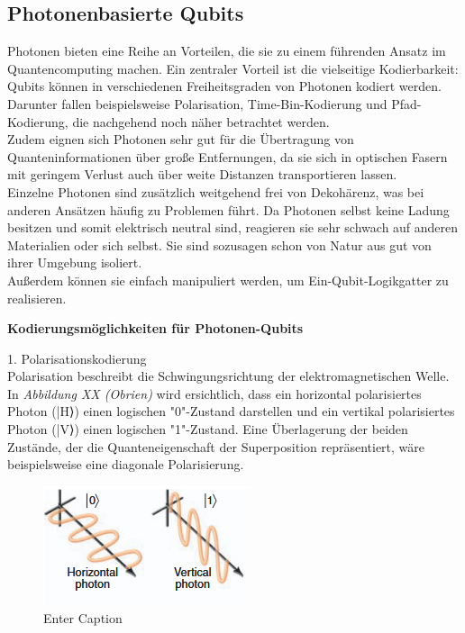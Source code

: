 \subsection{Photonenbasierte Qubits}
\label{subsec: Photonenbasierte Qubits}
Photonen bieten eine Reihe an Vorteilen, die sie zu einem führenden Ansatz im Quantencomputing machen. Ein zentraler Vorteil ist die vielseitige Kodierbarkeit: Qubits können in verschiedenen Freiheitsgraden von Photonen kodiert werden. Darunter fallen beispielsweise Polarisation, Time-Bin-Kodierung und Pfad-Kodierung, die nachgehend noch näher betrachtet werden. \\
Zudem eignen sich Photonen sehr gut für die Übertragung von Quanteninformationen über große Entfernungen, da sie sich in optischen Fasern mit geringem Verlust auch über weite Distanzen transportieren lassen. \\
Einzelne Photonen sind zusätzlich weitgehend frei von Dekohärenz, was bei anderen Ansätzen häufig zu Problemen führt. Da Photonen selbst keine Ladung besitzen und somit elektrisch neutral sind, reagieren sie sehr schwach auf anderen Materialien oder sich selbst. Sie sind sozusagen schon von Natur aus gut von ihrer Umgebung isoliert. \\
Außerdem können sie einfach manipuliert werden, um Ein-Qubit-Logikgatter zu realisieren. 

\textbf{Kodierungsmöglichkeiten für Photonen-Qubits}

1. Polarisationskodierung\\
Polarisation beschreibt die Schwingungsrichtung der elektromagnetischen Welle. In\textit{ Abbildung XX (Obrien)} wird ersichtlich, dass ein horizontal polarisiertes Photon (|H⟩) einen logischen "0"-Zustand darstellen und ein vertikal polarisiertes Photon (|V⟩) einen logischen "1"-Zustand. Eine Überlagerung der beiden Zustände, der die Quanteneigenschaft der Superposition repräsentiert, wäre beispielsweise eine diagonale Polarisierung. 
\begin{figure}
    \centering
    \includegraphics[width=0.5\linewidth]{images/physics/Photonen_Polarisierung.png}
    \caption{Enter Caption}
    \label{fig:enter-label}
\end{figure}
\cite{obrien_optical_2007}

